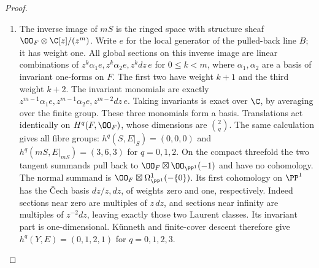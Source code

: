 \begin{proof}
\begin{enumerate}[label=\arabic*.,leftmargin=*]
\item The inverse image of $mS$ is the ringed space with structure sheaf $\OO_F\otimes\C[z]/(z^m)$. Write $e$ for the local generator of the pulled-back line $B$; it has weight one. All global sections on this inverse image are linear combinations of $z^k\alpha_1e,z^k\alpha_2e,z^kdz\,e$ for $0\le k<m$, where $\alpha_1,\alpha_2$ are a basis of invariant one-forms on $F$. The first two have weight $k+1$ and the third weight $k+2$. The invariant monomials are exactly
$z^{m-1}\alpha_1e,z^{m-1}\alpha_2e,z^{m-2}dz\,e$.
Taking invariants is exact over $\C$, by averaging over the finite group. These three monomials form a basis. Translations act identically on $H^q(F,\OO_F)$, whose dimensions are $\binom{2}{q}$. The same calculation gives all fibre groups: $h^q(S,E|_S)=(0,0,0)$ and $h^q(mS,E|_{mS})=(3,6,3)$ for $q=0,1,2$. On the compact threefold the two tangent summands pull back to $\OO_F\boxtimes\OO_{\PP^1}(-1)$ and have no cohomology. The normal summand is $\OO_F\boxtimes\Omega^1_{\PP^1}(-\{0\})$. Its first cohomology on $\PP^1$ has the \v Cech basis $dz/z,dz$, of weights zero and one, respectively. Indeed sections near zero are multiples of $z\,dz$, and sections near infinity are multiples of $z^{-2}dz$, leaving exactly those two Laurent classes. Its invariant part is one-dimensional. K\"unneth and finite-cover descent therefore give $h^q(Y,E)=(0,1,2,1)$ for $q=0,1,2,3$.

\end{enumerate}
\end{proof}